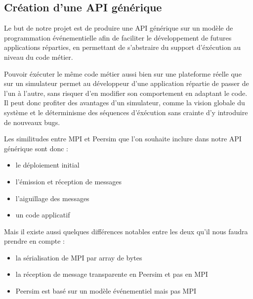 \documentclass{article}
\begin{document}
		
			\subsection{Création d'une API générique}
				Le but de notre projet est de produire une API générique sur un modèle de programmation événementielle afin de faciliter le développement de futures applications réparties, en permettant de s'abstraire du support d'éxécution au niveau du code métier. \par
Pouvoir éxécuter le même code métier aussi bien sur une plateforme réelle que sur un simulateur permet au développeur d'une application répartie de passer de l'un à l'autre, sans risquer d'en  modifier son comportement en adaptant le code. \newline Il peut donc profiter des avantages d'un simulateur, comme la vision globale du système et le déterminisme des séquences d'éxécution  sans crainte d'y introduire de nouveaux bugs. \par
Les similitudes entre MPI et Peersim que l'on souhaite inclure dans notre API générique sont donc : 
\begin{itemize}
\item le déploiement initial
\item l'émission et réception de messages
\item l'aiguillage des messages
\item un code applicatif
\end{itemize}
Mais il existe aussi quelques différences notables entre les deux qu'il nous faudra prendre en compte : 
\begin{itemize}
\item la sérialisation de MPI par array de bytes
\item la réception de message transparente en Peersim et pas en MPI
\item Peersim est basé sur un modèle événementiel mais pas MPI
\end{itemize}
 
			\newpage
\end{document}
